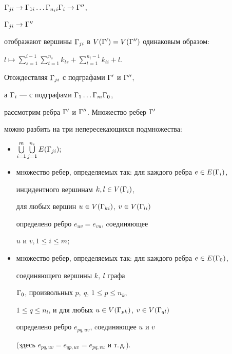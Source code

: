 \begin{pf}
${\Gamma}_{ji}\rightarrow {\Gamma}_{1i}\dotsc {\Gamma}_{n_ii}{\Gamma}_i\rightarrow {\Gamma}''$,


${\Gamma}_{ji}\rightarrow {\Gamma}''$


отображают вершины ${\Gamma}_{ji}$ в $V({\Gamma}')=V({\Gamma}'')$ одинаковым образом:


$l\mapsto \sum\limits_{s=1}^{i-1}\sum\limits_{t=1}^{n_s}k_{ts}+


\sum\limits_{t=1}^{n_i-1}k_{ti}+l$.





Отождествляя ${\Gamma}_{ji}$ с подграфами ${\Gamma}'$ и ${\Gamma}''$, 


а ${\Gamma}_i$ --- с подграфами ${\Gamma}_1\dotsc {\Gamma}_m{\Gamma}_0$,


рассмотрим ребра ${\Gamma}'$ и ${\Gamma}''$. Множество ребер ${\Gamma}'$ 


можно разбить на три непересекающихся подмножества:


\begin{itemize}


\item[1)]


$\bigcup \limits_{i=1}^m \bigcup \limits_{j=1}^{n_i} E({\Gamma}_{ji});$


\item[2)]


множество ребер, определяемых так: для каждого ребра $e\in E({\Gamma}_i)$, 


инцидентного вершинам $k, l\in V({\Gamma}_i)$,


для любых вершин $u\in V({\Gamma}_{ki})$, $v\in V({\Gamma}_{li})$ 


определено ребро $e_{uv}=e_{vu}$, cоединяющее 


$u$ и $v, 1\leq i\leq m;$ 


\item[3)]


множество ребер, определяемых так: для каждого ребра $e\in E({\Gamma}_0)$, 


соединяющего вершины $k,\ l$ графа 


${\Gamma}_0$, произвольных $p, \ q$, $1\leq p\leq n_k$,


$1\leq q\leq n_l$, и для любых $u\in V({\Gamma}_{pk})$, $v\in V({\Gamma}_{ql})$ 


определено ребро $e_{pq, uv}$, cоединяющее $u$ и $v$ 


(здесь $e_{pq, uv}=e_{qp, uv}=e_{pq, vu}$ и т.\,д.).


\end{itemize}






\end{pf}
